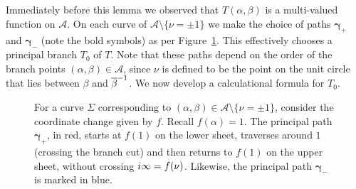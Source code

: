 \documentclass{article}
\begin{document}
Immediately before this lemma we observed that $T(\alpha,\beta)$ is a multi-valued function on $\mathcal{A}$. 
On each curve of $\mathcal{A}\setminus\{\nu = \pm 1\}$ we make the choice of paths $\boldsymbol{\gamma}_+$ and $\boldsymbol{\gamma}_-$ (note the bold symbols) as per Figure~\ref{fig:gamma paths}. This effectively chooses a principal branch $T_0$ of $T$. Note that these paths depend on the order of the branch points $(\alpha,\beta) \in \mathcal{A}$, since $\nu$ is defined to be the point on the unit circle that lies between $\beta$ and $\overline{\beta}^{-1}$. We now develop a calculational formula for $T_0$.

\begin{figure}
\caption{For a curve $\Sigma$ corresponding to $(\alpha,\beta)\in\mathcal{A}\setminus\{\nu = \pm 1\}$, consider the coordinate change given by $f$. Recall $f(\alpha)=1$. The principal path $\boldsymbol{\gamma}_+$, in red, starts at $f(1)$ on the lower sheet, traverses around $1$ (crossing the branch cut) and then returns to $f(1)$ on the upper sheet, without crossing $i\infty = f(\nu)$. Likewise, the principal path $\boldsymbol{\gamma}_-$ is marked in blue.\label{fig:gamma paths}}
\end{figure}
\end{document}
